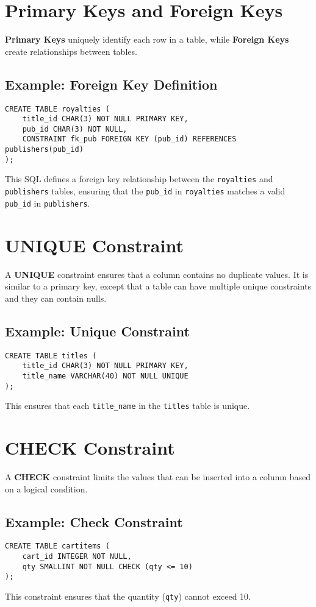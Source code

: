 \documentclass{article}
\begin{document}
\section{Primary Keys and Foreign Keys}
\textbf{Primary Keys} uniquely identify each row in a table, while \textbf{Foreign Keys} create relationships between tables.

\subsection{Example: Foreign Key Definition}
\begin{verbatim}
CREATE TABLE royalties (
    title_id CHAR(3) NOT NULL PRIMARY KEY,
    pub_id CHAR(3) NOT NULL,
    CONSTRAINT fk_pub FOREIGN KEY (pub_id) REFERENCES publishers(pub_id)
);
\end{verbatim}
This SQL defines a foreign key relationship between the \texttt{royalties} and \texttt{publishers} tables, ensuring that the \texttt{pub\_id} in \texttt{royalties} matches a valid \texttt{pub\_id} in \texttt{publishers}.

\section{UNIQUE Constraint}
A \textbf{UNIQUE} constraint ensures that a column contains no duplicate values. It is similar to a primary key, except that a table can have multiple unique constraints and they can contain nulls.

\subsection{Example: Unique Constraint}
\begin{verbatim}
CREATE TABLE titles (
    title_id CHAR(3) NOT NULL PRIMARY KEY,
    title_name VARCHAR(40) NOT NULL UNIQUE
);
\end{verbatim}
This ensures that each \texttt{title\_name} in the \texttt{titles} table is unique.

\section{CHECK Constraint}
A \textbf{CHECK} constraint limits the values that can be inserted into a column based on a logical condition.

\subsection{Example: Check Constraint}
\begin{verbatim}
CREATE TABLE cartitems (
    cart_id INTEGER NOT NULL,
    qty SMALLINT NOT NULL CHECK (qty <= 10)
);
\end{verbatim}
This constraint ensures that the quantity (\texttt{qty}) cannot exceed 10.
\end{document}
